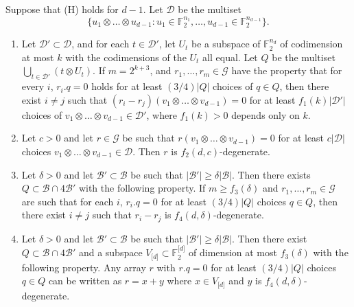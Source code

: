 \documentclass{toc}
\newcommand\F{\mathbb{F}}
\renewcommand\d{\delta}
\newcommand \cB{\mathcal B}
\newcommand \cD{\mathcal D}
\newcommand \cG{\mathcal G}
\newcommand \s{\subset}
\begin{document}
\begin{lemma} \label{focusondeg}
  Suppose that (H) holds for $d-1$. Let $\cD$ be the multiset
  \[
    \{u_1\otimes \dots \otimes u_{d-1}:u_1\in \F_2^{n_1},\dots,u_{d-1}\in\F_2^{n_{d-1}}\}.
  \]
  
	
	\begin{enumerate}[label=(\roman*)]
		\item Let $\cD'\s \cD$, and for each $t\in \cD'$, let $U_t$ be a subspace of $\F_2^{n_d}$ of codimension at most $k$ with the codimensions of the $U_t$ all equal. Let $Q$ be the multiset $\bigcup_{t\in \cD'}(t\otimes U_t)$. If $m=2^{k+3}$, and $r_1,\dots,r_m\in \cG$ have the property that for every $i$, $r_i.q=0$ holds for at least $({3}/{4}) |Q|$ choices of $q\in Q$, then there exist $i\neq j$ such that $(r_i-r_j)(v_1\otimes \dots \otimes v_{d-1})=0$ for at least $f_1(k)|\cD'|$ choices of $v_1\otimes \dots \otimes v_{d-1}\in \cD'$, where $f_1(k)>0$ depends only on $k$.
		
		\item Let $c>0$ and let $r\in \cG$ be such that $r(v_1\otimes \dots \otimes v_{d-1})=0$ for at least $c|\cD|$ choices $v_1\otimes \dots\otimes v_{d-1}\in \cD$. Then $r$ is $f_2(d,c)$-degenerate.
		
		\item Let $\d>0$ and let $\cB'\s \cB$ be such that $|\cB'|\geq \d |\cB|$. Then there exists $Q\subset \cB\cap 4\cB'$ with the following property. If $m\geq f_3(\d)$ and $r_1,\dots,r_m\in \cG$ are such that for each $i$, $r_i.q=0$ for at least $({3}/{4})|Q|$ choices $q\in Q$, then there exist $i\neq j$ such that $r_i-r_j$ is $f_4(d,\d)$-degenerate.
		
		\item Let $\d>0$ and let $\cB'\s \cB$ be such that $|\cB'|\geq \d |\cB|$. Then there exist $Q\subset \cB\cap 4\cB'$ and a subspace $V_{\lbrack d\rbrack}\s \F_2^{\lbrack d\rbrack}$ of dimension at most $f_3(\d)$ with the following property. Any array $r$ with $r.q=0$ for at least $({3}/{4})|Q|$ choices $q\in Q$ can be written as $r=x+y$ where $x\in V_{\lbrack d \rbrack}$ and $y$ is $f_4(d,\d)$-degenerate.
	\end{enumerate}
\end{lemma}
\end{document}
